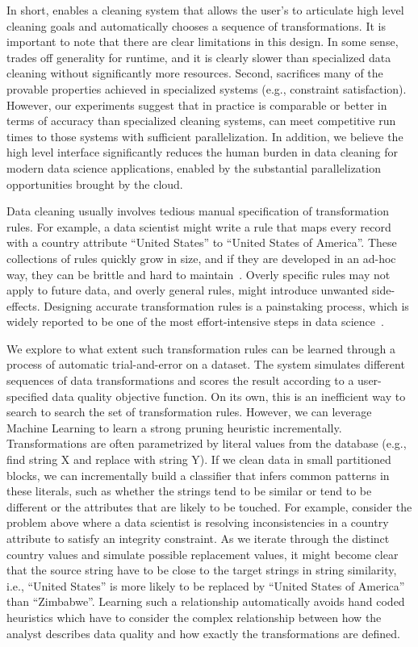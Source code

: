 In short, \sys enables a cleaning system that allows the user's to articulate high level cleaning goals and automatically chooses a sequence of transformations.  
It is important to note that there are clear limitations in this design.
In some sense, \sys trades off generality for runtime, and it is clearly slower than specialized data cleaning without significantly more resources.
Second, \sys sacrifices many of the provable properties achieved in specialized systems (e.g., constraint satisfaction). 
However, our experiments suggest that in practice \sys is comparable or better in terms of accuracy than specialized cleaning systems, can meet competitive run times to those systems with sufficient parallelization. In addition, we believe the high level interface significantly reduces the human burden in data cleaning for modern data science applications, enabled by the substantial parallelization opportunities brought by the cloud. 





Data cleaning usually involves tedious manual specification of transformation rules.
For example, a data scientist might write a rule that maps every record with a \textsf{country} attribute ``United States'' to ``United States of America''.
These collections of rules quickly grow in size, and if they are developed in an ad-hoc way, they can be brittle and hard to maintain~\cite{krishnan2016hilda}.
Overly specific rules may not apply to future data, and overly general rules, might introduce unwanted side-effects.
Designing accurate transformation rules is a painstaking process, which is widely reported to be one of the most effort-intensive steps in data science~\cite{nytimes}.

We explore to what extent such transformation rules can be learned through a process of automatic trial-and-error on a dataset.
The system simulates different sequences of data transformations and scores the result according to a user-specified data quality objective function.
On its own, this is an inefficient way to search to search the set of transformation rules.
However, we can leverage Machine Learning to learn a strong pruning heuristic incrementally.
Transformations are often parametrized by literal values from the database (e.g., find string X and replace with string Y).
If we clean data in small partitioned blocks, we can incrementally build a classifier that infers common patterns in these literals, such as whether the strings tend to be similar or tend to be different or the attributes that are likely to be touched.
For example, consider the problem above where a data scientist is resolving inconsistencies in a \textsf{country} attribute to satisfy an integrity constraint.
As we iterate through the distinct \textsf{country} values and simulate possible replacement values, it might become clear that the source string have to be close to the target strings in string similarity, i.e., ``United States'' is more likely to be replaced by ``United States of America'' than ``Zimbabwe''.
Learning such a relationship automatically avoids hand coded heuristics which have to consider the complex relationship between how the analyst describes data quality and how exactly the transformations are defined.

